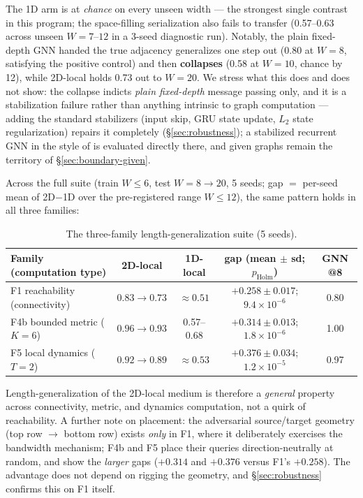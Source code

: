 \documentclass[11pt]{article}
\newcommand{\pholm}{p_{\mathrm{Holm}}}
\begin{document}
The 1D arm is at \emph{chance} on every unseen width --- the strongest single
contrast in this program; the space-filling serialization also fails to
transfer (0.57--0.63 across unseen $W = 7$--$12$ in a 3-seed diagnostic run).
Notably, the plain fixed-depth GNN handed the true adjacency generalizes one
step out (0.80 at $W = 8$, satisfying the positive control) and then
\textbf{collapses} (0.58 at $W = 10$, chance by 12), while 2D-local holds
0.73 out to $W = 20$. We stress what this does and does not show: the
collapse indicts \emph{plain fixed-depth} message passing only, and it is a
stabilization failure rather than anything intrinsic to graph computation ---
adding the standard stabilizers (input skip, GRU state update, $L_2$ state
regularization) repairs it completely (\S\ref{sec:robustness}); a stabilized
recurrent GNN in the style of \citet{groetschla2022recurrent} is evaluated
directly there, and given graphs remain the territory of
\S\ref{sec:boundary-given}.

Across the full suite (train $W \le 6$, test $W = 8 \to 20$, 5 seeds; gap
$=$ per-seed mean of 2D$-$1D over the pre-registered range $W \le 12$), the
same pattern holds in all three families:

\begin{table}[h]
\centering
\small
\begin{tabular}{lcccc}
\toprule
Family (computation type) & 2D-local & 1D-local & gap (mean $\pm$ sd; $\pholm$) & GNN @8 \\
\midrule
F1 reachability (connectivity) & $0.83 \to 0.73$ & $\approx 0.51$ & $+0.258 \pm 0.017$; $9.4\times10^{-6}$ & 0.80 \\
F4b bounded metric ($K = 6$) & $\mathbf{0.96 \to 0.93}$ & 0.57--0.68 & $+0.314 \pm 0.013$; $1.8\times10^{-6}$ & 1.00 \\
F5 local dynamics ($T = 2$) & $\mathbf{0.92 \to 0.89}$ & $\approx 0.53$ & $+0.376 \pm 0.034$; $1.2\times10^{-5}$ & 0.97 \\
\bottomrule
\end{tabular}
\caption{The three-family length-generalization suite (5 seeds).}
\label{tab:suite}
\end{table}

Length-generalization of the 2D-local medium is therefore a \emph{general}
property across connectivity, metric, and dynamics computation, not a quirk
of reachability. A further note on placement: the adversarial source/target
geometry (top row $\to$ bottom row) exists \emph{only} in F1, where it
deliberately exercises the bandwidth mechanism; F4b and F5 place their
queries direction-neutrally at random, and show the \emph{larger} gaps
($+0.314$ and $+0.376$ versus F1's $+0.258$). The advantage does not depend
on rigging the geometry, and \S\ref{sec:robustness} confirms this on F1
itself.
\end{document}
